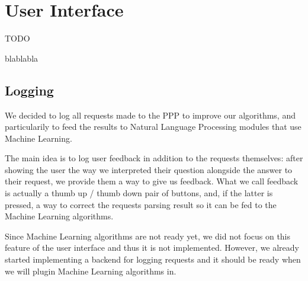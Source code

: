 \section{User Interface}

TODO

blablabla

\subsection{Logging}

We decided to log all requests made to the PPP to improve our algorithms,
and particularily to feed the results to Natural Language Processing
modules that use Machine Learning.

The main idea is to log user feedback in addition to the requests
themselves: after showing the user the way we interpreted their
question alongside the answer to their request, we provide them a
way to give us feedback.
What we call feedback is actually a thumb up / thumb down pair of
buttons, and, if the latter is pressed, a way to correct the requests
parsing result so it can be fed to the Machine Learning algorithms.

Since Machine Learning algorithms are not ready yet, we did not focus
on this feature of the user interface and thus it is not implemented.
However, we already started implementing a backend for logging requests
and it should be ready when we will plugin Machine Learning algorithms
in.
